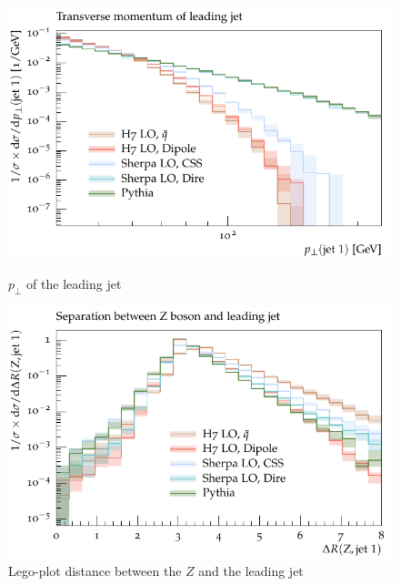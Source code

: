 \begin{figure}[h]
  \centering
  \begin{minipage}[t]{0.49\textwidth}
    \includegraphics[width=1\textwidth]{plots/Z-91-MuShower/LH_Z/jet1_pT.pdf}
    \caption{$p_\perp$ of the leading jet}
    \label{fig:z:jet1_pt}
  \end{minipage}
  \begin{minipage}[t]{0.49\textwidth}
    \includegraphics[width=1\textwidth]{plots/Z-91-MuShower/LH_Z/X_jet1_dR.pdf}
    \caption{Lego-plot distance between the $Z$ and the leading jet}
    \label{fig:z:deltaR}
  \end{minipage}
\end{figure}


